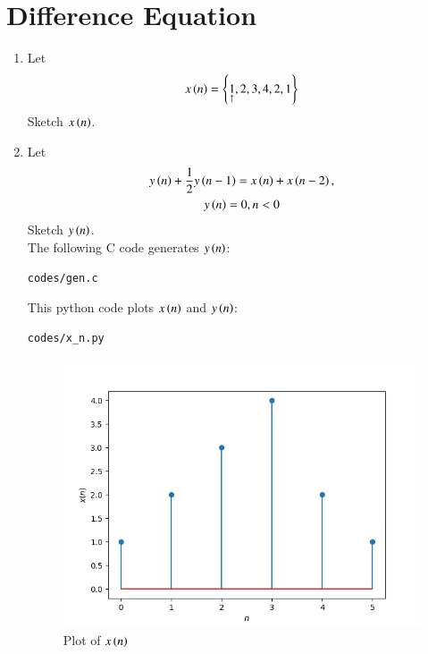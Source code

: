 \documentclass[journal,12pt,twocolumn]{IEEEtran}
\theoremstyle{remark}
\begin{document}
\section{Difference Equation}
\begin{enumerate}[label=\thesection.\arabic*,ref=\thesection.\theenumi]
\item Let
\begin{equation}
x\left(n\right) = \left\{\underset{\uparrow}{1},2,3,4,2,1\right\} \label{prob:2.1}
\end{equation}
Sketch $x\left(n\right)$. 

\item Let
\begin{multline}
y\left(n\right) + \frac{1}{2}y\left(n - 1\right) = x\left(n\right) + x\left(n-2\right), 
\\
y\left(n\right) = 0, n < 0 \label{prob:2.2}
\end{multline}
Sketch $y\left(n\right)$.\\

\solution The following C code generates $y\left(n\right)$:
\begin{lstlisting}
codes/gen.c
\end{lstlisting}
This python code plots $x\left(n\right)$ and $y\left(n\right)$:
\begin{lstlisting}
codes/x_n.py
\end{lstlisting}

\begin{figure}[ht]
    \includegraphics[width=0.8\columnwidth]{figs/x_n.png}
    \caption{Plot of $x\left(n\right)$}
\end{figure}


\end{enumerate}
\end{document}
